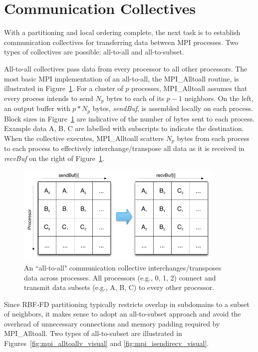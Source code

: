 \documentclass{report}
\begin{document}

\section{Communication Collectives}
\label{sec:mpi_collectives}

With a partitioning and local ordering complete, the next task is to establish communication collectives for transferring data between MPI processes. Two types of collectives are possible: all-to-all and all-to-subset. 

All-to-all collectives pass data from every processor to all other processors. The most basic MPI implementation of an all-to-all, the MPI\_Alltoall routine, is illustrated in Figure~\ref{fig:mpi_alltoall_visual}. For a cluster of $p$ processes, MPI\_Alltoall assumes that every process intends to send $N_p$ bytes to each of its $p-1$ neighbors. On the left, an output buffer with $p*N_p$ bytes, \emph{sendBuf}, is assembled locally on each process. Block sizes in Figure~\ref{fig:mpi_alltoall_visual} are indicative of the number of bytes sent to each process. Example data A, B, C are labelled with subscripts to indicate the destination.  When the collective executes, MPI\_Alltoall scatters $N_p$ bytes from each process to each process to effectively interchange/transpose all data as it is received in \emph{recvBuf} on the right of Figure~\ref{fig:mpi_alltoall_visual}. 

\begin{figure}
\centering
\includegraphics[width=10cm]{../figures/omnigraffle/MPI_Alltoall_Visual.png}
\caption{An ``all-to-all" communication collective interchanges/transposes data across processes. All processors (e.g., 0, 1, 2) connect and transmit data subsets (e.g., A, B, C) to every other processor.}
\label{fig:mpi_alltoall_visual}
\end{figure}

Since RBF-FD partitioning typically restricts overlap in subdomains to a subset of neighbors, it makes sense to adopt an all-to-subset approach and avoid the overhead of unnecessary connections and memory padding required by MPI\_Alltoall. 
Two types of all-to-subset are illustrated in Figures~\ref{fig:mpi_alltoallv_visual} and \ref{fig:mpi_isendirecv_visual}. 
\end{document}
